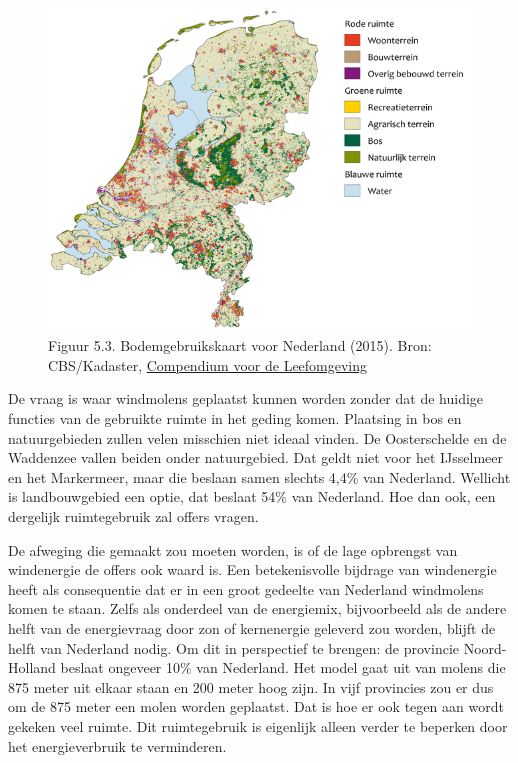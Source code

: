 \documentclass[
  11pt,
  a4paper,
]{book}
\begin{document}
\begin{figure}
\centering
\includegraphics{bodemkaartNL.png}
\caption{Figuur 5.3. Bodemgebruikskaart voor Nederland (2015). Bron: CBS/Kadaster, \href{https://www.clo.nl/indicatoren/nl0061-bodemgebruikskaart-voor-nederland}{Compendium voor de Leefomgeving}}
\end{figure}

De vraag is waar windmolens geplaatst kunnen worden zonder dat de huidige functies van de gebruikte ruimte in het geding komen. Plaatsing in bos en natuurgebieden zullen velen misschien niet ideaal vinden. De Oosterschelde en de Waddenzee vallen beiden onder natuurgebied. Dat geldt niet voor het IJsselmeer en het Markermeer, maar die beslaan samen slechts 4,4\% van Nederland. Wellicht is landbouwgebied een optie, dat beslaat 54\% van Nederland. Hoe dan ook, een dergelijk ruimtegebruik zal offers vragen.

De afweging die gemaakt zou moeten worden, is of de lage opbrengst van windenergie de offers ook waard is. Een betekenisvolle bijdrage van windenergie heeft als consequentie dat er in een groot gedeelte van Nederland windmolens komen te staan. Zelfs als onderdeel van de energiemix, bijvoorbeeld als de andere helft van de energievraag door zon of kernenergie geleverd zou worden, blijft de helft van Nederland nodig. Om dit in perspectief te brengen: de provincie Noord-Holland beslaat ongeveer 10\% van Nederland. Het model gaat uit van molens die 875 meter uit elkaar staan en 200 meter hoog zijn. In vijf provincies zou er dus om de 875 meter een molen worden geplaatst. Dat is hoe er ook tegen aan wordt gekeken veel ruimte. Dit ruimtegebruik is eigenlijk alleen verder te beperken door het energieverbruik te verminderen.
\end{document}
